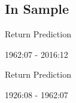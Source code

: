 \documentclass[handout]{beamer}
\begin{document}
\subsection{In Sample}
%			

\begin{frame}{Return Prediction}
	\vspace{-6pt}
	\begin{center}
		1962:07 - 2016:12
	\end{center}
	\vspace{-30pt}
	\begin{table}
		\begin{adjustbox}{width=\textwidth,height=3.5cm}
			
		\end{adjustbox}
	\end{table}
\end{frame}

%			
%		

\begin{frame}{Return Prediction}
	\vspace{-6pt}
	\begin{center}
		1926:08 - 1962:07
	\end{center}
	\vspace{-30pt}
	\begin{table}
		\begin{adjustbox}{width=\textwidth,height=3.5cm}
			
		\end{adjustbox}
		
	\end{table}
\end{frame}
\end{document}
